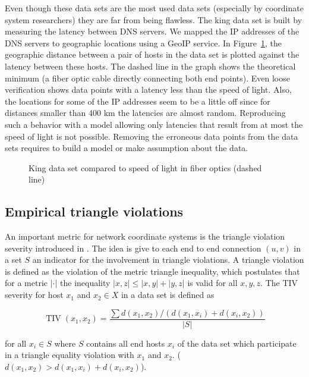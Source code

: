 \documentclass{sig-alternate-10pt}
\begin{document}
\begin{enumerate}
Even though these data sets are the most used data sets (especially by coordinate system researchers) they are far from being flawless. The king data set is built by measuring the latency between DNS servers. We mapped the IP addresses of the DNS servers to geographic locations using a GeoIP service. In Figure~\ref{kingscatterfig}, the geographic distance between a pair of hosts in the data set is plotted against the latency between these hosts.  The dashed line in the graph shows the  theoretical minimum (a fiber optic cable directly connecting both end points).
Even loose verification  shows data points with a latency less than the speed of light. Also, the locations for some of the IP addresses seem to be a little off since for distances smaller than 400 km the latencies are almost random. Reproducing such a behavior with a model allowing only latencies that result from at most the speed of light is not possible. Removing the erroneous data points from the data sets requires to build a model or make assumption about the data. 



\begin{figure}
\caption{King data set compared to speed of light in fiber optics (dashed line)} 
\label{kingscatterfig}
\end{figure}

\subsection{Empirical triangle violations}
\label{sec:empir-triangle-viol}

An important metric for network coordinate systems is the triangle violation severity introduced in \cite{Wang2007a}. The idea is give to each end to end connection $(u,v)$ in a set $S$ an indicator for the involvement in triangle violations. A triangle violation is defined as the violation of the metric triangle inequality, which postulates that for a metric $| \cdot |$ the inequality $|x,z| \le |x,y| + |y,z|$ is valid for all $x,y,z$. The TIV severity for host $x_1$ and $x_2 \in X$ in a data set is defined as

\begin{equation}\operatorname{TIV}(x_1,x_2)=\frac{\sum d(x_1,x_2)/(d(x_1,x_i) + d(x_i,x_2))}{|S|}\end{equation}

\noindent for all $x_i \in S$ where $S$ contains all end hosts $x_i$ of the data set which participate in a triangle equality violation with $x_1$ and $x_2$. ($d(x_1,x_2) > d(x_1,x_i) + d(x_i,x_2)$).


\end{enumerate}
\end{document}
